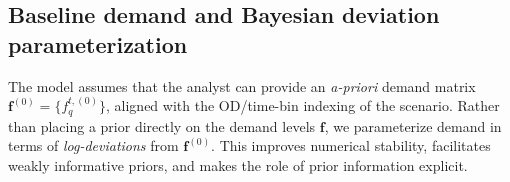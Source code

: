 \subsection{Baseline demand and Bayesian deviation parameterization}

The model assumes that the analyst can provide an \emph{a-priori} demand matrix
$\bm f^{(0)}=\{f_{q}^{t,(0)}\}$, aligned with the OD/time-bin indexing of the scenario.
Rather than placing a prior directly on the demand levels $\bm f$, we parameterize demand
in terms of \emph{log-deviations} from $\bm f^{(0)}$. This improves numerical stability,
facilitates weakly informative priors, and makes the role of prior information explicit.

